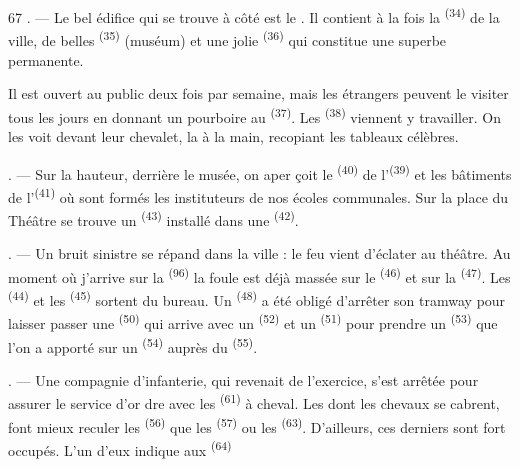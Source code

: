 \begin{VUpage}[69]{67}
. --- Le bel édifice qui se trouve à côté est le\nl
{}. Il contient à la fois la \textsuperscript{(34)} de la\nl
ville, de belles \textsuperscript{(35)}\nl
(muséum) et une jolie \textsuperscript{(36)} qui\nl
constitue une superbe  permanente.

Il est ouvert au public deux fois par semaine, mais\nl
les étrangers peuvent le visiter tous les jours en\nl
donnant un pourboire au \textsuperscript{(37)}. Les \nl
{}\textsuperscript{(38)} viennent y travailler. On les voit devant\nl
leur chevalet, la  à la main, recopiant les\nl
tableaux célèbres.

. --- Sur la hauteur, derrière le musée, on aper\cc
çoit le \textsuperscript{(40)} de l'\textsuperscript{(39)} et les bâtiments de\nl
l'\textsuperscript{(41)} où sont formés les instituteurs\nl
de nos écoles communales. Sur la place du Théâtre se\nl
trouve un \textsuperscript{(43)} installé dans une\nl
{}\textsuperscript{(42)}.

\VUsaut{5.0mm}
\VUsaut{3.0mm}

. --- Un bruit sinistre se répand dans la ville : le feu\nl
vient d'éclater au théâtre. Au moment où j'arrive sur\nl
la \textsuperscript{(96)} la foule est déjà massée sur le \cc
{}\textsuperscript{(46)} et sur la \textsuperscript{(47)}. Les \nl
{}\textsuperscript{(44)} et les \textsuperscript{(45)} sortent du bureau. Un\nl
{}\textsuperscript{(48)} a été obligé d'arrêter son tramway\nl
pour laisser passer une \nl
{}\textsuperscript{(50)} qui arrive avec un \textsuperscript{(52)} et\nl
un \textsuperscript{(51)} pour prendre un \textsuperscript{(53)} que l'on\nl
a apporté sur un \textsuperscript{(54)} auprès du \nl
{}\textsuperscript{(55)}.

. --- Une compagnie d'infanterie, qui revenait de\nl
l'exercice, s'est arrêtée pour assurer le service d'or\cc
dre avec les \textsuperscript{(61)} à cheval. Les\nl
{} dont les chevaux se cabrent, font mieux\nl
reculer les \textsuperscript{(56)} que les \textsuperscript{(57)} ou les\nl
{}\textsuperscript{(63)}. D'ailleurs, ces derniers sont fort\nl
occupés. L'un d'eux indique aux \textsuperscript{(64)}
\parplein
\end{VUpage}

